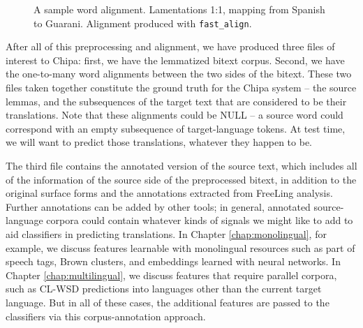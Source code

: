 \begin{figure*}
  \caption{A sample word alignment. Lamentations 1:1, mapping from Spanish to
  Guarani. Alignment produced with \texttt{fast\_align}.}
  \label{fig:example-word-alignment}
\end{figure*}


After all of this preprocessing and alignment, we have produced three files of
interest to Chipa: first, we have the lemmatized bitext corpus. Second, we have
the one-to-many word alignments between the two sides of the bitext. These two
files taken together constitute the ground truth for the Chipa system -- the
source lemmas, and the subsequences of the target text that are considered to
be their translations. Note that these alignments could be NULL -- a source
word could correspond with an empty subsequence of target-language tokens. At
test time, we will want to predict those translations, whatever they happen to
be.

The third file contains the annotated version of the source text, which
includes all of the information of the source side of the preprocessed bitext,
in addition to the original surface forms and the annotations extracted from
FreeLing analysis. Further annotations can be added by other tools; in general,
annotated source-language corpora could contain whatever kinds of signals we
might like to add to aid classifiers in predicting translations. In Chapter
\ref{chap:monolingual}, for example, we discuss features learnable with
monolingual resources such as part of speech tags, Brown clusters, and
embeddings learned with neural networks. In Chapter \ref{chap:multilingual}, we
discuss features that require parallel corpora, such as CL-WSD predictions into
languages other than the current target language. But in all of these cases,
the additional features are passed to the classifiers via this
corpus-annotation approach.


